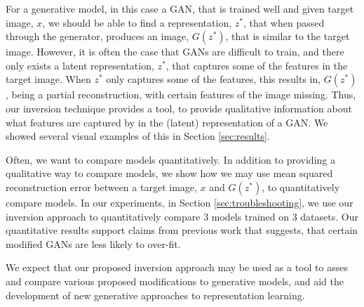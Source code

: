 \documentclass[journal]{IEEEtran}
\begin{document}
For a generative model, in this case a GAN, that is trained well and given target image, $x$, we should be able to find a representation, $z^*$, that when passed through the generator, produces an image, $G(z^*)$, that is similar to the target image. However, it is often the case that GANs are difficult to train, and there only exists a latent representation, $z^*$, that captures some of the features in the target image. When $z^*$ only captures some of the features, this results in, $G(z^*)$, being a partial reconstruction, with certain features of the image missing. Thus, our inversion technique provides a tool, to provide qualitative information about what features are captured by in the (latent) representation of a GAN. We showed several visual examples of this in Section \ref{sec:results}.

Often, we want to compare models quantitatively. In addition to providing a qualitative way to compare models, we show how we may use mean squared reconstruction error between a target image, $x$ and $G(z^*)$, to quantitatively compare models. In our experiments, in Section \ref{sec:troubleshooting}, we use our inversion approach to quantitatively compare $3$ models trained on $3$ datasets. Our quantitative results support claims from previous work that suggests, that certain modified GANs are less likely to over-fit.

We expect that our proposed inversion approach may be used as a tool to asses and compare various proposed modifications to generative models, and aid the development of new generative approaches to representation learning.




\end{document}
